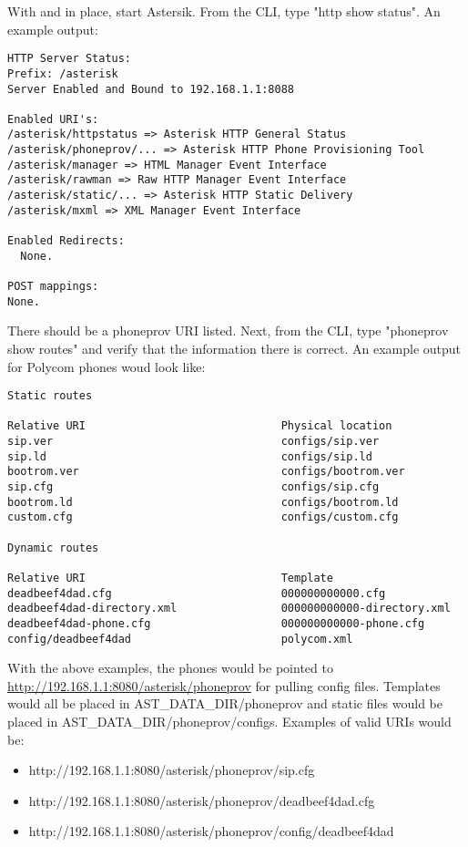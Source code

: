 With  and  in place, start Astersik. From the CLI, 
type "http show status". An example output:
\begin{astlisting}
\begin{verbatim}
HTTP Server Status:
Prefix: /asterisk
Server Enabled and Bound to 192.168.1.1:8088

Enabled URI's:
/asterisk/httpstatus => Asterisk HTTP General Status
/asterisk/phoneprov/... => Asterisk HTTP Phone Provisioning Tool
/asterisk/manager => HTML Manager Event Interface
/asterisk/rawman => Raw HTTP Manager Event Interface
/asterisk/static/... => Asterisk HTTP Static Delivery
/asterisk/mxml => XML Manager Event Interface

Enabled Redirects:
  None.

POST mappings:
None.
\end{verbatim}
\end{astlisting}

There should be a phoneprov URI listed. Next, from the CLI, type "phoneprov show routes" 
and verify that the information there is correct. An example output for Polycom phones 
woud look like:

\begin{astlisting}
\begin{verbatim}
Static routes

Relative URI                              Physical location             
sip.ver                                   configs/sip.ver               
sip.ld                                    configs/sip.ld                
bootrom.ver                               configs/bootrom.ver           
sip.cfg                                   configs/sip.cfg               
bootrom.ld                                configs/bootrom.ld            
custom.cfg                                configs/custom.cfg            

Dynamic routes

Relative URI                              Template                      
deadbeef4dad.cfg                          000000000000.cfg              
deadbeef4dad-directory.xml                000000000000-directory.xml    
deadbeef4dad-phone.cfg                    000000000000-phone.cfg        
config/deadbeef4dad                       polycom.xml                   
\end{verbatim}
\end{astlisting}

With the above examples, the phones would be pointed to 
\url{http://192.168.1.1:8080/asterisk/phoneprov} for pulling config files. Templates 
would all be placed in AST\_DATA\_DIR/phoneprov and static files would be placed in 
AST\_DATA\_DIR/phoneprov/configs. Examples of valid URIs would be:

\begin{itemize}
\item http://192.168.1.1:8080/asterisk/phoneprov/sip.cfg
\item http://192.168.1.1:8080/asterisk/phoneprov/deadbeef4dad.cfg
\item http://192.168.1.1:8080/asterisk/phoneprov/config/deadbeef4dad
\end{itemize}

